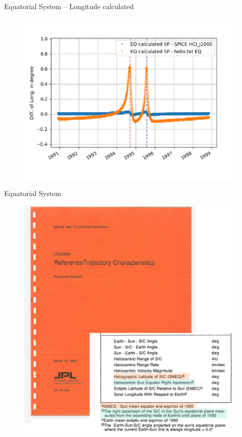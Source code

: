 \documentclass{beamer}
\begin{document}
\begin{frame}{Equatorial System -- Longitude calculated}
\begin{figure}									
	\includegraphics[width=1\textwidth]{Pics/EQ_LONG_CALC.png}
\end{figure}
\end{frame}

\begin{frame}{Equatorial System}
\begin{figure}									
	\includegraphics[width=.7\textwidth]{Pics/KrystynaRef.png}
\end{figure}
\end{frame}
\end{document}

